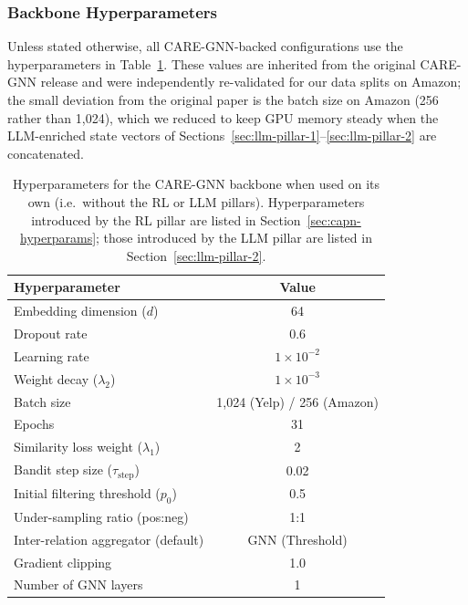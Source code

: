 \subsubsection{Backbone Hyperparameters}
\label{sec:care-hparams}

Unless stated otherwise, all CARE-GNN-backed configurations use the hyperparameters in Table~\ref{tab:care-hparams}. These values are inherited from the original CARE-GNN release and were independently re-validated for our data splits on Amazon; the small deviation from the original paper is the batch size on Amazon (256 rather than 1{,}024), which we reduced to keep GPU memory steady when the LLM-enriched state vectors of Sections~\ref{sec:llm-pillar-1}--\ref{sec:llm-pillar-2} are concatenated.

\begin{table}[h!]
\centering
\begin{tabular}{|l|c|}
\hline
\textbf{Hyperparameter} & \textbf{Value} \\
\hline
Embedding dimension ($d$)                & 64 \\
Dropout rate                             & 0.6 \\
Learning rate                            & $1 \times 10^{-2}$ \\
Weight decay ($\lambda_2$)               & $1 \times 10^{-3}$ \\
Batch size                               & 1{,}024 (Yelp) / 256 (Amazon) \\
Epochs                                   & 31 \\
Similarity loss weight ($\lambda_1$)     & 2 \\
Bandit step size ($\tau_{\text{step}}$)  & 0.02 \\
Initial filtering threshold ($p_0$)      & 0.5 \\
Under-sampling ratio (pos:neg)           & 1:1 \\
Inter-relation aggregator (default)      & GNN (Threshold) \\
Gradient clipping                        & 1.0 \\
Number of GNN layers                     & 1 \\
\hline
\end{tabular}
\caption{Hyperparameters for the CARE-GNN backbone when used on its own (i.e.\ without the RL or LLM pillars). Hyperparameters introduced by the RL pillar are listed in Section~\ref{sec:capn-hyperparams}; those introduced by the LLM pillar are listed in Section~\ref{sec:llm-pillar-2}.}
\label{tab:care-hparams}
\end{table}

